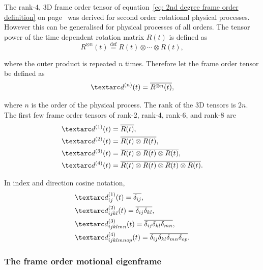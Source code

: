 The rank-4, 3D frame order tensor of equation~\ref{eq: 2nd degree frame order definition} on page~\pageref{eq: 2nd degree frame order definition} was derived for second order rotational physical processes.
However this can be generalised for physical processes of all orders.
The tensor power of the time dependent rotation matrix $R(t)$ is defined as
\begin{equation}
    R^{\otimes n}(t) \overset{\mathrm{def}}{=} R(t) \otimes \cdots \otimes R(t) ,
\end{equation}

where the outer product is repeated $n$ times.
Therefore let the frame order tensor be defined as
\begin{equation} \label{eq: frame order definition}
    \FOn(t) = \overline{R^{\otimes n}(t)} ,
\end{equation}

where $n$ is the order of the physical process.
The rank of the 3D tensors is $2n$.
The first few frame order tensors of rank-2, rank-4, rank-6, and rank-8 are
\begin{subequations}
\begin{align}
    \FOone(t) &= \overline{R(t)} , \\
    \FOtwo(t) &= \overline{R(t) \otimes R(t)} , \\
    \FOthree(t) &= \overline{R(t) \otimes R(t) \otimes R(t)} , \\
    \FOfour(t) &= \overline{R(t) \otimes R(t) \otimes R(t) \otimes R(t)} .
\end{align}
\end{subequations}

In index and direction cosine notation,
\begin{subequations}
\begin{align}
    &\FOone_{ij}(t) = \overline{\delta_{ij}} , \\
    &\FOtwo_{ijkl}(t) = \overline{\delta_{ij}\delta_{kl}} , \\
    &\FOthree_{ijklmn}(t) = \overline{\delta_{ij}\delta_{kl}\delta_{mn}} , \\
    &\FOfour_{ijklmnop}(t) = \overline{\delta_{ij}\delta_{kl}\delta_{mn}\delta_{op}} .
\end{align}
\end{subequations}





\subsubsection{The frame order motional eigenframe}

